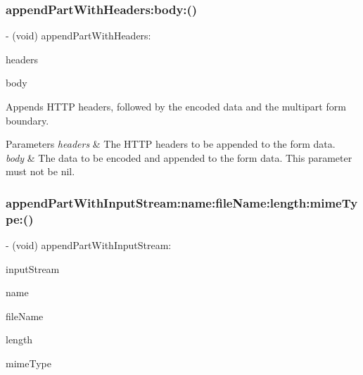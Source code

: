 \subsubsection{\texorpdfstring{append\+Part\+With\+Headers\+:body\+:()}{appendPartWithHeaders:body:()}\hspace{0.1cm}{\footnotesize\ttfamily [3/3]}}
{\footnotesize\ttfamily -\/ (void) append\+Part\+With\+Headers\+: \begin{DoxyParamCaption}\item[{(nullable N\+S\+Dictionary $\ast$)}]{headers }\item[{body:(N\+S\+Data $\ast$)}]{body }\end{DoxyParamCaption}}

Appends H\+T\+TP headers, followed by the encoded data and the multipart form boundary.


\begin{DoxyParams}{Parameters}
{\em headers} & The H\+T\+TP headers to be appended to the form data. \\
\hline
{\em body} & The data to be encoded and appended to the form data. This parameter must not be {\ttfamily nil}. \\
\hline
\end{DoxyParams}
\mbox{\label{protocol_a_f_multipart_form_data-p_aa8e577ad5f3171bf618c12e1ee45b8ab}} 
\subsubsection{\texorpdfstring{append\+Part\+With\+Input\+Stream\+:name\+:file\+Name\+:length\+:mime\+Type\+:()}{appendPartWithInputStream:name:fileName:length:mimeType:()}\hspace{0.1cm}{\footnotesize\ttfamily [1/3]}}
{\footnotesize\ttfamily -\/ (void) append\+Part\+With\+Input\+Stream\+: \begin{DoxyParamCaption}\item[{(nullable N\+S\+Input\+Stream $\ast$)}]{input\+Stream }\item[{name:(N\+S\+String $\ast$)}]{name }\item[{fileName:(N\+S\+String $\ast$)}]{file\+Name }\item[{length:(int64\+\_\+t)}]{length }\item[{mimeType:(N\+S\+String $\ast$)}]{mime\+Type }\end{DoxyParamCaption}}

